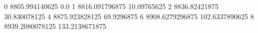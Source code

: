 0 8805.994140625 0.0
1 8816.091796875 10.09765625
2 8836.82421875 30.830078125
4 8875.923828125 69.9296875
6 8908.6279296875 102.6337890625
8 8939.2080078125 133.2138671875
